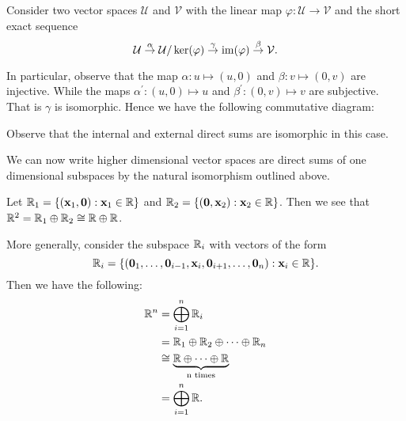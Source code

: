 Consider two vector spaces $\mathcal{U}$ and $\mathcal{V}$ with the linear
map $\varphi: \mathcal{U} \to \mathcal{V}$ and the short exact sequence
\[
	\mathcal{U} \stackrel{\alpha}{\to}
	\mathcal{U} / \ker(\varphi) \stackrel{\gamma}{\to}
	\operatorname{im}(\varphi) \stackrel{\beta}{\to} \mathcal{V}.
\]

In particular, observe that the map
$\alpha: u \mapsto (u,0)$ and
$\beta: v \mapsto (0,v)$ are injective. While the maps
$\alpha^{'}: (u,0) \mapsto u$ and
$\beta^{'}: (0,v) \mapsto v$ are subjective. That is
$\gamma$ is isomorphic.
Hence we have the following commutative diagram:
\begin{center}
\end{center}

Observe that the internal and external direct sums are isomorphic in this case.

We can now write higher dimensional vector spaces are direct sums of one
dimensional subspaces by the natural isomorphism outlined above.

\begin{exmp}
	Let $\mathbb{R}_1 = \{ (\mathbf{x}_1,\mathbf{0}) : \mathbf{x}_1 \in \mathbb{R} \}$
	and $\mathbb{R}_2 = \{ (\mathbf{0},\mathbf{x}_2) : \mathbf{x}_2 \in \mathbb{R} \}$.
	Then we see that $\mathbb{R}^2 = \mathbb{R}_1 \oplus \mathbb{R}_2 \cong \mathbb{R} \oplus \mathbb{R}$.
\end{exmp}

More generally, consider the subspace $\mathbb{R}_i$ with vectors of the form
\[
	\mathbb{R}_i = \{ ( \mathbf{0}_1, \dots , \mathbf{0}_{i-1}, \mathbf{x}_i,
	\mathbf{0}_{i+1}, \dots , \mathbf{0}_n) : \mathbf{x}_i \in \mathbb{R} \}.
\]
Then we have the following:
\begin{align*}
	\mathbb{R}^n &= \bigoplus_{i=1}^{n} \mathbb{R}_i
	\\
	&= \mathbb{R}_1 \oplus \mathbb{R}_2 \oplus \dots \oplus \mathbb{R}_n
	\\
	& \cong \underbrace{\mathbb{R} \oplus \dots \oplus \mathbb{R}}_{\text{n times}}
	\\
	&= \bigoplus_{i=1}^{n} \mathbb{R}.
\end{align*}
